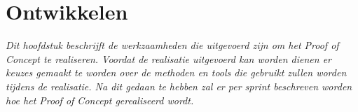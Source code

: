 \chapter{Ontwikkelen}

\textit{Dit hoofdstuk beschrijft de werkzaamheden die uitgevoerd zijn om het Proof of Concept te realiseren. Voordat de realisatie uitgevoerd kan worden dienen er keuzes gemaakt te worden over de methoden en tools die gebruikt zullen worden tijdens de realisatie. Na dit gedaan te hebben zal er per sprint beschreven worden hoe het Proof of Concept gerealiseerd wordt.}



\clearpage


\clearpage


\clearpage
